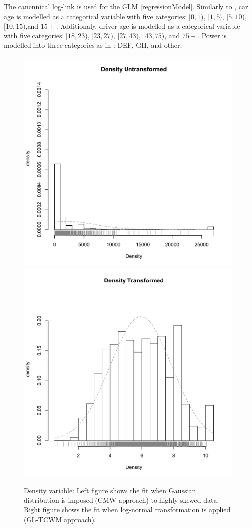 \documentclass[11pt,letterpaper]{article}
\numberwithin{equation}{section}
\numberwithin{equation}{section}
\numberwithin{equation}{section}
\begin{document}
The canonnical log-link is used for the GLM \eqref{regressionModel}. Similarly to \cite{risks_miljkovic},
car age is modelled as a categorical variable with five categories: $[0,1)$, $[1,5)$, $[5,10)$, $[10,15)$,and $15+$. Additionaly, driver age is modelled as a categorical variable with five categories: $[18,23)$, $[23,27)$, $[27,43)$, $[43,75)$, and $75+$. Power is modelled into three categories as in \cite{Charpentier:2014}:
DEF, GH, and other. 
\begin{figure}[!htb]
\begin{center}
\caption{Density variable: Left figure shows the fit when Gaussian distribution is imposed (CMW approach) to highly skewed data. Right figure shows the fit when log-normal transformation is applied (GL-TCWM approach).}
\includegraphics[scale=0.40]{Density.pdf}
\includegraphics[scale=0.40]{logDensity.pdf}

\end{center}
\end{figure}
\end{document}
